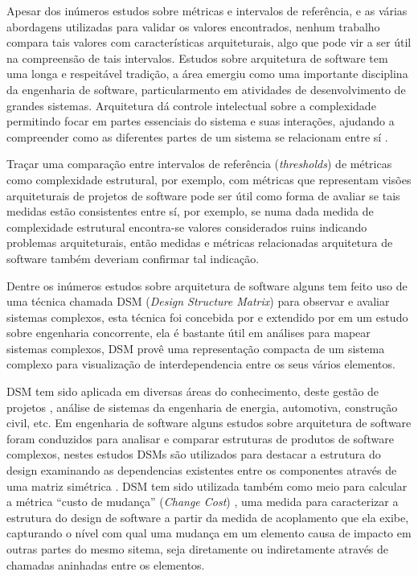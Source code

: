 Apesar dos inúmeros estudos sobre métricas e intervalos de referência, e as
várias abordagens utilizadas para validar os valores encontrados, nenhum trabalho
compara tais valores com características arquiteturais,
algo que pode vir a ser útil na compreensão de tais intervalos.
Estudos sobre arquitetura de software tem uma longa e respeitável tradição, a
área emergiu como uma importante disciplina da engenharia de software,
particularmento em atividades de desenvolvimento de grandes sistemas.
Arquitetura dá controle intelectual sobre a complexidade permitindo focar em
partes essenciais do sistema e suas interações, ajudando a compreender como as
diferentes partes de um sistema se relacionam entre sí \cite{Clements2002Book}.

Traçar uma comparação entre intervalos de referência ({\it thresholds}) de
métricas como complexidade estrutural, por exemplo, com métricas que
representam visões arquiteturais de projetos de software pode ser útil como
forma de avaliar se tais medidas estão consistentes entre sí, por exemplo, se
numa dada medida de complexidade estrutural encontra-se valores considerados
ruins indicando problemas arquiteturais, então medidas e métricas relacionadas
arquitetura de software também deveriam confirmar tal indicação.

Dentre os inúmeros estudos sobre arquitetura de software alguns tem feito uso
de uma técnica chamada DSM ({\it Design Structure Matrix}) para observar e
avaliar sistemas complexos, esta técnica foi concebida por
 e extendido por  em um estudo
sobre engenharia concorrente, ela é bastante útil em análises para mapear
sistemas complexos, DSM provê uma representação compacta de um sistema complexo
para visualização de interdependencia entre os seus vários elementos.

DSM tem sido aplicada em diversas áreas do conhecimento, deste gestão de
projetos \cite{Browning2016}, análise de sistemas da engenharia de energia,
automotiva, construção civil, etc. Em engenharia de software alguns estudos
sobre arquitetura de software foram conduzidos para analisar e comparar
estruturas de produtos de software complexos, nestes estudos DSMs são
utilizados para destacar a estrutura do design examinando as dependencias
existentes entre os componentes através de uma matriz simétrica
\cite{Steward1981}. DSM tem sido utilizada também como meio para calcular a
métrica ``custo de mudança'' ({\it Change Cost}) \cite{Maccormack2006},
uma medida para caracterizar a estrutura do design de software a partir da
medida de acoplamento que ela exibe, capturando o nível com qual uma mudança em
um elemento causa de impacto em outras partes do mesmo sitema, seja diretamente
ou indiretamente através de chamadas aninhadas entre os elementos.

